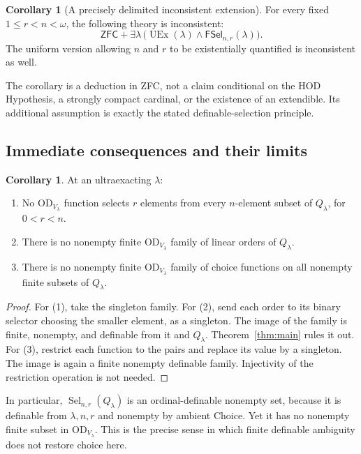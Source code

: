 \documentclass[11pt,letterpaper]{article}
\theoremstyle{definition}
\newtheorem{corollary}[definition]{Corollary}
\newcommand{\ZFC}{\mathsf{ZFC}}
\newcommand{\OD}{\mathrm{OD}}
\newcommand{\UEx}{\operatorname{UEx}}
\newcommand{\Sel}{\operatorname{Sel}}
\newcommand{\FSel}{\mathsf{FSel}}
\begin{document}
\begin{corollary}[A precisely delimited inconsistent extension]\label{cor:inconsistent}
For every fixed $1\leq r<n<\omega$, the following theory is inconsistent:
\[
 \ZFC+\exists\lambda\,
 \bigl(\UEx(\lambda)\wedge\FSel_{n,r}(\lambda)\bigr).
\]
The uniform version allowing $n$ and $r$ to be existentially quantified is inconsistent as well.
\end{corollary}

The corollary is a deduction in ZFC, not a claim conditional on the HOD Hypothesis, a strongly compact cardinal, or the existence of an extendible. Its additional assumption is exactly the stated definable-selection principle.

\subsection{Immediate consequences and their limits}

\begin{corollary}\label{cor:orders}
At an ultraexacting $\lambda$:
\begin{enumerate}
\item No $\OD_{V_\lambda}$ function selects $r$ elements from every $n$-element subset of $Q_\lambda$, for $0<r<n$.
\item There is no nonempty finite $\OD_{V_\lambda}$ family of linear orders of $Q_\lambda$.
\item There is no nonempty finite $\OD_{V_\lambda}$ family of choice functions on all nonempty finite subsets of $Q_\lambda$.
\end{enumerate}
\end{corollary}

\begin{proof}
For (1), take the singleton family. For (2), send each order to its binary selector choosing the smaller element, as a singleton. The image of the family is finite, nonempty, and definable from it and $Q_\lambda$. Theorem~\ref{thm:main} rules it out. For (3), restrict each function to the pairs and replace its value by a singleton. The image is again a finite nonempty definable family. Injectivity of the restriction operation is not needed.
\end{proof}

In particular, $\Sel_{n,r}(Q_\lambda)$ is an ordinal-definable nonempty set, because it is definable from $\lambda,n,r$ and nonempty by ambient Choice. Yet it has no nonempty finite subset in $\OD_{V_\lambda}$. This is the precise sense in which finite definable ambiguity does not restore choice here.
\end{document}
